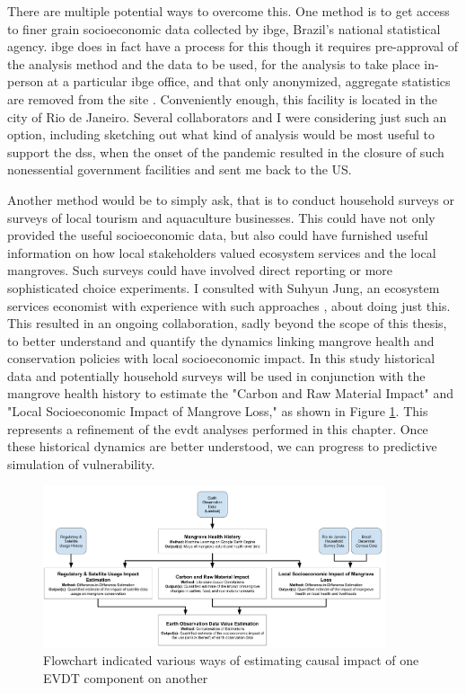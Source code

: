 There are multiple potential ways to overcome this. One method is to get access to finer grain socioeconomic data collected by \ac{ibge}, Brazil's national statistical agency. \ac{ibge} does in fact have a process for this though it requires pre-approval of the analysis method and the data to be used, for the analysis to take place in-person at a particular \ac{ibge} office, and that only anonymized, aggregate statistics are removed from the site \cite{institutobrasileirodegeografiaeestatisticaPedidosComoFazer2014}. Conveniently enough, this facility is located in the city of Rio de Janeiro. Several collaborators and I were considering just such an option, including sketching out what kind of analysis would be most useful to support the \ac{dss}, when the onset of the pandemic resulted in the closure of such nonessential government facilities and sent me back to the US. 

Another method would be to simply ask, that is to conduct household surveys or surveys of local tourism and aquaculture businesses. This could have not only provided the useful socioeconomic data, but also could have furnished useful information on how local stakeholders valued ecosystem services and the local mangroves. Such surveys could have involved direct reporting or more sophisticated choice experiments. I consulted with Suhyun Jung, an ecosystem services economist with experience with such approaches \cite{jungBrazilNationalEnvironmental2017, jungPartnershipsPreventDeforestation2018, jungEvidenceWealthImprovingEffects2019a}, about doing just this. This resulted in an ongoing collaboration, sadly beyond the scope of this thesis, to better understand and quantify the dynamics linking mangrove health and conservation policies with local socioeconomic impact. In this study historical data and potentially household surveys will be used in conjunction with the mangrove health history to estimate the "Carbon and Raw Material Impact" and "Local Socioeconomic Impact of Mangrove Loss," as shown in Figure \ref{fig:method}. This represents a refinement of the \ac{evdt} analyses performed in this chapter. Once these historical dynamics are better understood, we can progress to predictive simulation of vulnerability.

\begin{figure}[!htb] 
\centering
\includegraphics[width=0.9\textwidth]{Figures/chap4/Method_Flowchart.png}
\caption{Flowchart indicated various ways of estimating causal impact of one EVDT component on another}
\label{fig:method}
\end{figure}

